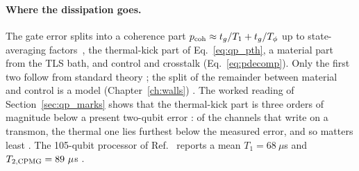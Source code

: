 \paragraph{Where the dissipation goes.} The gate error splits into a coherence part $p_{\rm coh}\approx t_g/T_1+t_g/T_\phi$ up to
state-averaging factors~\cite{Abad2022}, the thermal-kick part of Eq.~\eqref{eq:qp_pth}, a material part from the TLS bath, and control
and crosstalk (Eq.~\eqref{eq:pdecomp}). Only the first two follow from standard theory \derived; the split of the remainder between
material and control is a model (Chapter~\ref{ch:walls}) \conjecture. The worked reading of Section~\ref{sec:qp_marks} shows that the
thermal-kick part is three orders of magnitude below a present two-qubit error \calc: of the channels that write on a transmon, the thermal
one lies furthest below the measured error, and so matters least \interp. The 105-qubit processor of
Ref.~\cite{GoogleWillow2025} reports a mean $T_1=68~\mu$s and $T_{2,\rm CPMG}=89~\mu$s \observed.


